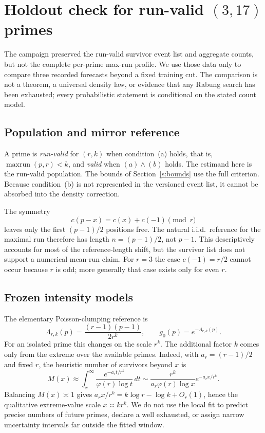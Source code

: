 \section{Holdout check for run-valid
\texorpdfstring{$(3,17)$}{(3,17)} primes}\label{s:density}

The campaign preserved the run-valid survivor event list and aggregate counts,
but not the complete per-prime max-run profile.  We use those data only to
compare three recorded forecasts beyond a fixed training cut. The comparison is
not a theorem, a universal density law, or evidence that any Rabung search has
been exhausted; every probabilistic statement is conditional on the stated
count model.

\subsection{Population and mirror reference}\label{ss:runlaw}

A prime is \emph{run-valid} for $(r,k)$ when condition~(a) holds, that is,
$\operatorname{maxrun}(p,r)<k$, and \emph{valid} when $(a)\wedge(b)$ holds.
The estimand here is the run-valid population.  The bounds of
Section~\ref{s:bounds} use the full criterion.  Because condition~(b) is not
represented in the versioned event list, it cannot be absorbed into the
density correction.

The symmetry
\[
  c(p-x)=c(x)+c(-1) \pmod r
\]
leaves only the first $(p-1)/2$ positions free.  The natural i.i.d.\ reference
for the maximal run therefore has length $n=(p-1)/2$, not $p-1$.  This
descriptively accounts for most of the reference-length shift, but the survivor
list does not support a numerical mean-run claim.  For $r=3$ the case
$c(-1)=r/2$ cannot occur because $r$ is odd; more generally that case exists
only for even $r$.

\subsection{Frozen intensity models}\label{ss:barelaw}

The elementary Poisson-clumping reference is
\[
  \Lambda_{r,k}(p)=\frac{(r-1)(p-1)}{2r^k},
  \qquad
  g_{0}(p)=e^{-\Lambda_{r,k}(p)}.
\]
For an isolated prime this changes on the scale $r^k$. The additional factor
$k$ comes only from the extreme over the available primes. Indeed, with
$a_r=(r-1)/2$ and fixed $r$, the heuristic number of survivors beyond $x$ is
\[
 M(x)\approx\int_x^\infty
 \frac{e^{-a_rt/r^k}}{\varphi(r)\log t}\,dt
 \sim \frac{r^k}{a_r\varphi(r)\log x}e^{-a_rx/r^k}.
\]
Balancing $M(x)\asymp1$ gives
$a_rx/r^k=k\log r-\log k+O_r(1)$, hence the qualitative extreme-value scale
$x\asymp kr^k$. We do not use the local fit to predict precise
numbers of future primes, declare a well exhausted, or assign narrow
uncertainty intervals far outside the fitted window.

